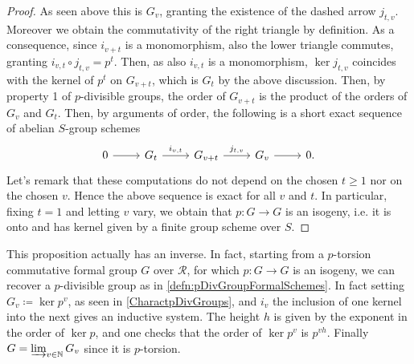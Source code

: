 \begin{proof}
	As seen above this is $G_v$, granting the existence of the 
	dashed arrow $j_{t,v}$.
	Moreover we obtain the commutativity
	of the right triangle by definition.
	As a consequence, since $i_{v+t}$ is a monomorphism,
	also the lower triangle commutes, granting
	$i_{v,t} \circ j_{t,v} = p^t$.
	Then, as also $i_{v,t}$ is a monomorphism, $\ker j_{t,v}$
	coincides with the kernel of $p^t$ on $G_{v+t}$, 
	which is $G_t$ by the above discussion.
	Then, by property 1 of $p$-divisible groups,
	the order of $G_{v+t}$ is the product of the orders
	of $G_v$ and $G_t$. Then, by arguments of order, the following is a
	short exact sequence of abelian $S$-group schemes
	\begin{equation}\label{eqn:pDivGrInducedmultiplication}
	\begin{tikzcd}
		0 \arrow[r, "", rightarrow] &
		G_t \arrow[r, "i_{v,t}", rightarrow] &
		G_{v+t} \arrow[r, "j_{t,v}", rightarrow] &
		G_v \arrow[r, "", rightarrow] &
		0
	.\end{tikzcd}
	\end{equation}
	Let's remark that these computations do not depend on the chosen $t \geq 1$
	nor on the chosen $v$.
	Hence the above sequence is exact for all $v$ and $t$.
	In particular, fixing $t=1$ and letting $v$ vary,
	we obtain that $p\colon G \to G$ is an isogeny,
	i.e. it is onto and has kernel given by a finite group scheme over $S$.
\end{proof}


\begin{rem}[]
	This proposition actually has an inverse.
	In fact, starting from a $p$-torsion commutative formal group $G$ over
	$\mathscr{R}$, for which $p\colon G \to G$ is an isogeny, we can recover a $p$-divisible
	group as in \cref{defn:pDivGroupFormalSchemes}.
	In fact setting $G_v \coloneqq \ker p^v$, as seen in \cref{CharactpDivGroups},
	and $i_v$ the inclusion of one kernel into the next gives an inductive system.
	The height $h$ is given by the exponent in the order of $\ker p$,
	and one checks that the order of $\ker p^v$ is $p^{vh}$.
	Finally $G = \varinjlim_{v \in \mathbb{N}} G_v$ since it is $p$-torsion.
\end{rem}



